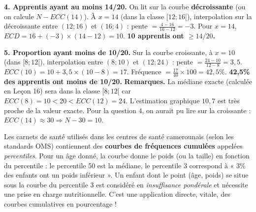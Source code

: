 \documentclass[11pt]{article}
\newcounter{popsec}
\newcounter{popsub}
\newcommand{\courssub}[1]{%
  \stepcounter{popsub}%
  \par\vspace{9pt}\noindent{\popxbold\fontsize{11.5}{13}\selectfont\color{popink}{\color{poporange}\thepopsec.\thepopsub}\hspace{6pt}#1}\par\nopagebreak\vspace{4pt}
}
\begin{document}
\begin{exoresolu}
\noindent \textbf{4. Apprentis ayant au moins 14/20.} On lit sur la courbe \textbf{décroissante} (ou on calcule $N - ECC(14)$). À $x=14$ (dans la classe $[12;16[$), interpolation sur la décroissante entre $(12;16)$ et $(16;4)$ : pente $= \frac{4-16}{16-12} = -3$. Pour $x=14$, $ECD = 16 + (-3)\times(14-12) = 10$. \textbf{10 apprentis ont $\ge 14/20$.}

\noindent \textbf{5. Proportion ayant moins de 10/20.} Sur la courbe croissante, à $x=10$ (dans $[8;12[$), interpolation entre $(8;10)$ et $(12;24)$ : pente $= \frac{24-10}{12-8} = 3,5$. $ECC(10) = 10 + 3,5 \times (10-8) = 17$. Fréquence $= \frac{17}{40} \times 100 = 42,5\%$. \textbf{42,5\% des apprentis ont moins de 10/20.}
\tcblower
\textbf{Remarques.} La médiane exacte (calculée en Leçon 16) sera dans la classe $[8;12[$ car $ECC(8)=10 < 20 < ECC(12)=24$. L'estimation graphique $10,7$ est très proche de la valeur exacte. Pour la question 4, on aurait pu lire sur la croissante : $ECC(14) \approx 30 \Rightarrow N - 30 = 10$.
\end{exoresolu}

\begin{savaistu}
Les carnets de santé utilisés dans les centres de santé camerounais (selon les standards OMS) contiennent des \textbf{courbes de fréquences cumulées} appelées \emph{percentiles}. Pour un âge donné, la courbe donne le poids (ou la taille) en fonction du percentile : le percentile 50 est la médiane, le percentile 3 correspond à « 3\% des enfants ont un poids inférieur ». Un enfant dont le point (âge, poids) se situe sous la courbe du percentile 3 est considéré en \emph{insuffisance pondérale} et nécessite une prise en charge nutritionnelle. C'est une application directe, vitale, des courbes cumulatives en pourcentage !
\end{savaistu}

\courssub{Synthèse des points clés}
\end{document}

